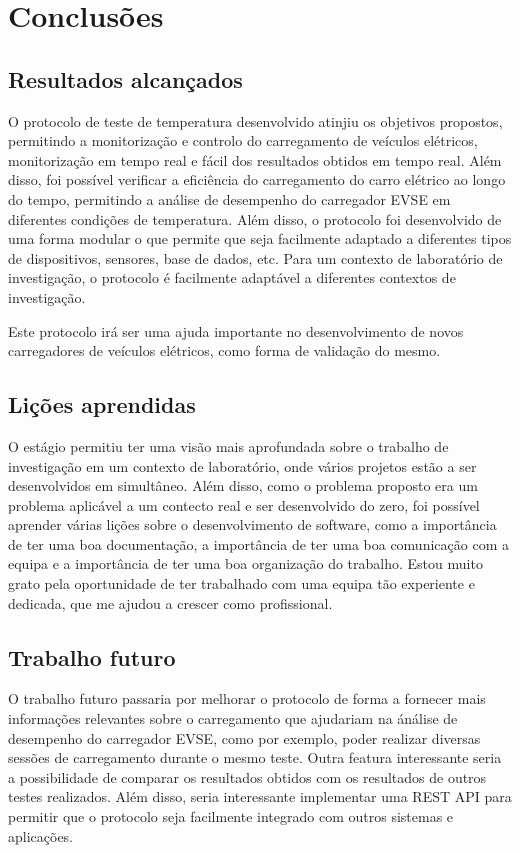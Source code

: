 
\section{Conclusões}


\subsection{Resultados alcançados} 	
O protocolo de teste de temperatura desenvolvido atinjiu os objetivos propostos, permitindo a monitorização e controlo do carregamento de 
veículos elétricos, monitorização em tempo real e fácil dos resultados obtidos em tempo real. Além disso, foi possível verificar a eficiência 
do carregamento do carro elétrico ao longo do tempo, permitindo a análise de desempenho do carregador EVSE em diferentes condições de 
temperatura.
Além disso, o protocolo foi desenvolvido de uma forma modular o que permite que seja facilmente adaptado a diferentes tipos de dispositivos,
sensores, base de dados, etc. Para um contexto de laboratório de investigação, o protocolo é facilmente adaptável a diferentes 
contextos de investigação. 

Este protocolo irá ser uma ajuda importante no desenvolvimento de novos carregadores de veículos elétricos, como forma de validação do mesmo.


\subsection{Lições aprendidas} 	
O estágio permitiu ter uma visão mais aprofundada sobre o trabalho de investigação em um contexto de laboratório, onde vários projetos
estão a ser desenvolvidos em simultâneo. Além disso, como o problema proposto era um problema aplicável a um contecto real e ser 
desenvolvido do zero, foi possível aprender várias lições sobre o desenvolvimento de software, como a importância de ter uma boa
documentação, a importância de ter uma boa comunicação com a equipa e a importância de ter uma boa organização do trabalho.
Estou muito grato pela oportunidade de ter trabalhado com uma equipa tão experiente e dedicada, que me ajudou a 
crescer como profissional. 
	
\subsection{Trabalho futuro} 
O trabalho futuro passaria por melhorar o protocolo de forma a fornecer mais informações relevantes sobre o carregamento
que ajudariam na ánálise de desempenho do carregador EVSE, como por exemplo, poder realizar diversas sessões de 
carregamento durante o mesmo teste. 
Outra featura interessante seria a possibilidade de comparar os resultados obtidos com os resultados de outros testes realizados.
Além disso, seria interessante implementar uma REST API para permitir que o protocolo seja facilmente integrado com outros sistemas e aplicações.
	

